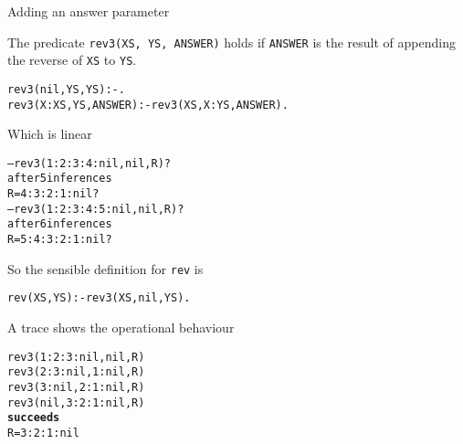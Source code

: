 \documentclass{popl}
\def\user#1{{#1}}
\newenvironment{smalltt}{\begin{alltt}\smaller}{\end{alltt}}
\def\succeeds{\textrm{\textbf{succeeds}}}
\begin{document}
\begin{foil} 
Adding an answer parameter

The predicate {\tt rev3(XS, YS, ANSWER)} holds if {\tt ANSWER} is the
result of appending the reverse of {\tt XS} to {\tt YS}.

\begin{smalltt}
        rev3(nil,  YS, YS)      :- .                     
        rev3(X:XS, YS, ANSWER)  :- rev3(XS, X:YS, ANSWER).       
\end{smalltt}

Which is linear
\begin{smalltt}
        -- \user{rev3(1:2:3:4:nil, nil, R)?}
        after 5 inferences 
        R = 4 : 3 : 2 : 1 : nil ?
        -- \user{rev3(1:2:3:4:5:nil, nil, R)?}
        after 6 inferences 
        R = 5 : 4 : 3 : 2 : 1 : nil ? 
\end{smalltt}

So the sensible definition for {\tt rev} is
\begin{smalltt}
        rev(XS, YS) :- rev3(XS, nil, YS).
\end{smalltt}

A trace shows the operational behaviour
\begin{smalltt}
        rev3(1 : 2 : 3 : nil, nil, R)
        rev3(2 : 3 : nil, 1 : nil, R)
        rev3(3 : nil, 2 : 1 : nil, R)
        rev3(nil, 3 : 2 : 1 : nil, R)
        \succeeds
        R = 3 : 2 : 1 : nil
\end{smalltt}

\end{foil}
\end{document}
